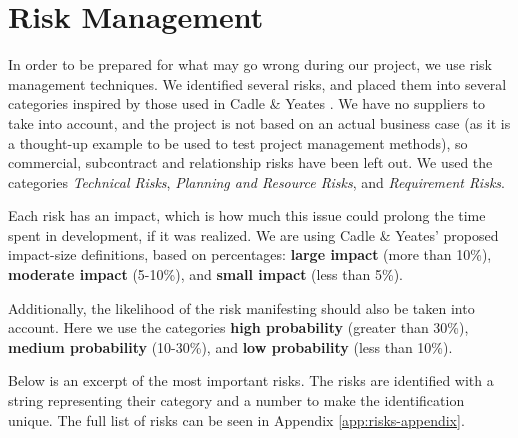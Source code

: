 \section{Risk Management}

In order to be prepared for what may go wrong during our project, we use risk management techniques.
We identified several risks, and placed them into several categories inspired by those used in Cadle
\& Yeates \cite{caye}. We have no suppliers to take into account, and the project is not
based on an actual business case (as it is a thought-up example to be used to test project management
methods), so commercial, subcontract and relationship risks have been left out. We used the categories
\emph{Technical Risks}, \emph{Planning and Resource Risks}, and \emph{Requirement Risks}.

Each risk has an impact, which is how much this issue could prolong the time spent in development,
if it was realized. We are using Cadle \& Yeates' proposed impact-size definitions, based on percentages:
\textbf{large impact} (more than 10\%), \textbf{moderate impact} (5-10\%), and \textbf{small impact}
(less than 5\%).

Additionally, the likelihood of the risk manifesting should also be taken into account. Here we use the
categories \textbf{high probability} (greater than 30\%), \textbf{medium probability} (10-30\%), and
\textbf{low probability} (less than 10\%).

Below is an excerpt of the most important risks. The risks are
identified with a string representing their category and a number to make the identification unique. The
full list of risks can be seen in Appendix \ref{app:risks-appendix}.

